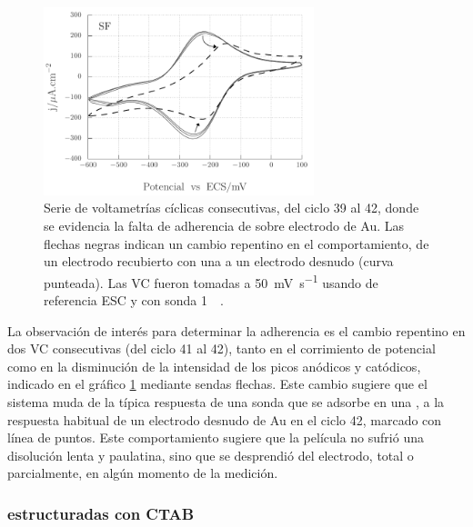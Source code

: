 				\begin{figure}[bh!]
				 	   	    \begin{center} 
				        	\includegraphics[width=0.70\textwidth]{Graficos/Adherencia_F127.pdf}
				       		\caption[Adherencia de \pdmF \space sobre una película delgada de Au.]{Serie de voltametrías cíclicas consecutivas, del ciclo 39 al 42, donde se evidencia la falta de adherencia de \pdmF\space sobre electrodo de Au. Las flechas negras indican un cambio repentino en el comportamiento, de un electrodo recubierto con una \pdm\space a un electrodo desnudo (curva punteada). Las VC fueron tomadas a \SI{50}{\milli\volt.\second^{-1}} usando de referencia ESC y con sonda \ru\space \SI{1}{\milli\Molar}.}
				         	\label{fig:adherencia_F127}
				     		\end{center}
				     		\end{figure}

			La observación de interés para determinar la adherencia es el cambio repentino en dos VC consecutivas (del ciclo 41 al 42), tanto en el corrimiento de potencial como en la disminución de la intensidad de los picos anódicos y catódicos, indicado en el gráfico \ref{fig:adherencia_F127} mediante sendas flechas. Este cambio sugiere que el sistema muda de la típica respuesta de una sonda que se adsorbe en una \pdm, a la respuesta habitual de un electrodo desnudo de Au en el ciclo 42, marcado con línea de puntos. Este comportamiento sugiere que la película no sufrió una disolución lenta y paulatina, sino que se desprendió del electrodo, total o parcialmente, en algún momento de la medición.	     		

			\subsubsection*{\pdm\space estructuradas con CTAB}	     		
				     		

